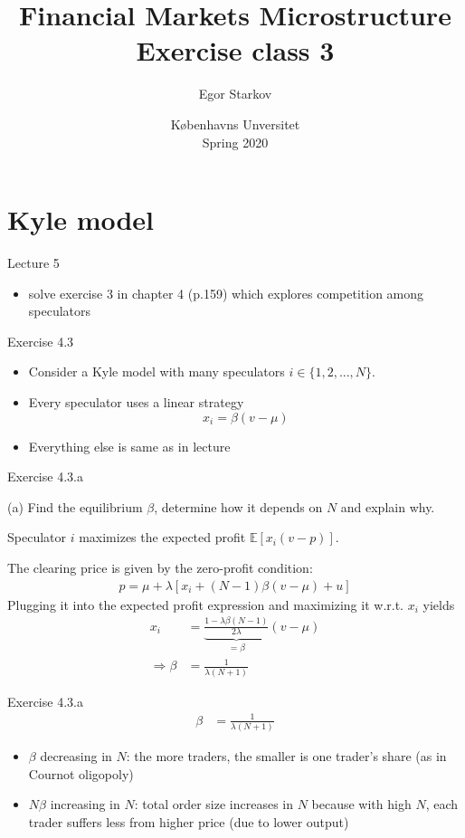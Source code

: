 \documentclass[english,10pt]{beamer}
\title{Financial Markets Microstructure \\ Exercise class 3}
\author{Egor Starkov}
\date{K{\o}benhavns Unversitet \\
	Spring 2020}
\begin{document}
\frame[plain]{\titlepage}
\addtocounter{framenumber}{-1}



\section{Kyle model}

\begin{frame}{Lecture 5}
	\begin{itemize}
		\item solve exercise 3 in chapter 4 (p.159) which explores competition among speculators
	\end{itemize}
\end{frame}


\begin{frame}{Exercise 4.3}
	\begin{itemize}
		\item Consider a Kyle model with many speculators $i \in \{1,2,...,N\}$.
		\item Every speculator uses a linear strategy
		$$ x_i = \beta (v-\mu) $$
		\item Everything else is same as in lecture
	\end{itemize}
\end{frame}


\begin{frame}{Exercise 4.3.a}
	\begin{exampleblock}{}
		(a) Find the equilibrium $\beta$, determine how it depends on $N$ and explain why.
	\end{exampleblock}
	
	Speculator $i$ maximizes the expected profit $\mathbb{E} [x_i (v-p)]$.
	
	The clearing price is given by the zero-profit condition:
	\begin{align*}
		p = \mu + \lambda [x_i + (N-1) \beta (v-\mu) + u]
	\end{align*}
	Plugging it into the expected profit expression and maximizing it w.r.t. $x_i$ yields
	\begin{align*}
		x_i &= \underbrace{\frac{1 - \lambda \beta (N-1)}{2 \lambda}}_{=\beta} (v-\mu)
		\\
		\Rightarrow
		\beta &= \frac{1}{\lambda (N+1)}
	\end{align*}
\end{frame}


\begin{frame}{Exercise 4.3.a}
	\begin{align*}
	\beta &= \frac{1}{\lambda (N+1)}
	\end{align*}
	
	\begin{itemize}
		\item $\beta$ decreasing in $N$: the more traders, the smaller is one trader's share (as in Cournot oligopoly)
		\item $N \beta$ increasing in $N$: total order size increases in $N$ because with high $N$, each trader suffers less from higher price (due to lower output)
	\end{itemize}
\end{frame}
\end{document}
